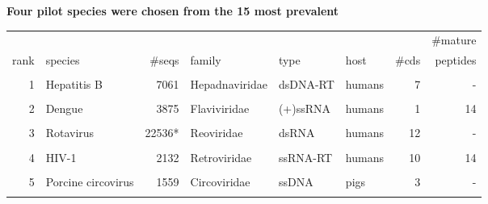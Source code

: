 \documentclass[landscape]{slides}
\begin{document}
\begin{slide}
\begin{center}

\textbf{Four pilot species were chosen from the 15 most prevalent}

\tiny
\begin{tabular}{r|l|r|l|l|l|r|r}
       &                    &              &                &          &        &       & \#mature \\ 
  rank & species            &       \#seqs & family         & type     & host   & \#cds & peptides \\ \hline
       &                    &              &                &          &        &       &          \\ 
\textcolor{myorange}{1} & \textcolor{myorange}{Hepatitis B}        &         \textcolor{myorange}{7061} & \textcolor{myorange}{Hepadnaviridae} & \textcolor{myorange}{dsDNA-RT} & \textcolor{myorange}{humans} &     \textcolor{myorange}{7} &       \textcolor{myorange}{-}  \\
       &                    &              &                &          &        &       &          \\ 
\textcolor{myorange}{2} & \textcolor{myorange}{Dengue}             &         \textcolor{myorange}{3875} & \textcolor{myorange}{Flaviviridae}   & \textcolor{myorange}{(+)ssRNA} & \textcolor{myorange}{humans} &     \textcolor{myorange}{1} &      \textcolor{myorange}{14}  \\
       &                    &              &                &          &        &       &          \\ 
     3 & Rotavirus          &      22536*  & Reoviridae     & dsRNA    & humans &    12 &       -  \\
       &                    &              &                &          &        &       &          \\ 
     4 & HIV-1              &        2132  & Retroviridae   & ssRNA-RT & humans &    10 &      14  \\
       &                    &              &                &          &        &       &          \\ 
     5 & Porcine circovirus &        1559  & Circoviridae   & ssDNA    & pigs   &     3 &       -  \\
       &                    &              &                &          &        &       &          \\ 

\end{tabular}
\end{center}
\end{slide}
\end{document}
